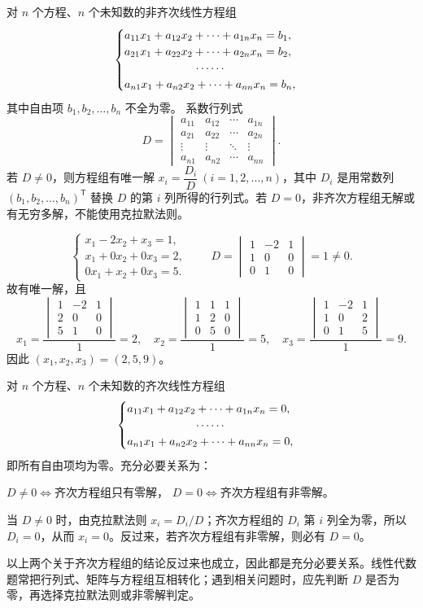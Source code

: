 \documentclass[UTF8,zihao=5,fontset=mac]{ctexart}
\newcommand{\dmat}[1]{\begin{vmatrix}#1\end{vmatrix}}
\begin{document}
\begin{summarybox}[一、非齐次线性方程组]
对 $n$ 个方程、$n$ 个未知数的非齐次线性方程组
\[
\begin{cases}
a_{11}x_1+a_{12}x_2+\cdots+a_{1n}x_n=b_1,\\
a_{21}x_1+a_{22}x_2+\cdots+a_{2n}x_n=b_2,\\
\hfill\cdots\cdots\hfill\\
a_{n1}x_1+a_{n2}x_2+\cdots+a_{nn}x_n=b_n,
\end{cases}
\]
其中自由项 $b_1,b_2,\ldots,b_n$ 不全为零。
系数行列式
\[
D=\dmat{a_{11}&a_{12}&\cdots&a_{1n}\\a_{21}&a_{22}&\cdots&a_{2n}\\\vdots&\vdots&\ddots&\vdots\\a_{n1}&a_{n2}&\cdots&a_{nn}}.
\]
若 $D\ne0$，则方程组有唯一解 $\boxed{x_i=\dfrac{D_i}{D}}\ (i=1,2,\ldots,n)$，其中 $D_i$ 是用常数列 $(b_1,b_2,\ldots,b_n)^{\mathsf T}$ 替换 $D$ 的第 $i$ 列所得的行列式。若 $D=0$，非齐次方程组无解或有无穷多解，不能使用克拉默法则。
\end{summarybox}

\begin{problembox}[示例]
\[
\begin{cases}
x_1-2x_2+x_3=1,\\
x_1+0x_2+0x_3=2,\\
0x_1+x_2+0x_3=5.
\end{cases}
\qquad
D=\dmat{1&-2&1\\1&0&0\\0&1&0}=1\ne0.
\]
故有唯一解，且
\[
x_1=\frac{\dmat{1&-2&1\\2&0&0\\5&1&0}}{1}=2,\quad
x_2=\frac{\dmat{1&1&1\\1&2&0\\0&5&0}}{1}=5,\quad
x_3=\frac{\dmat{1&-2&1\\1&0&2\\0&1&5}}{1}=9.
\]
因此 $(x_1,x_2,x_3)=(2,5,9)$。
\end{problembox}

\begin{summarybox}[二、齐次线性方程组]
对 $n$ 个方程、$n$ 个未知数的齐次线性方程组
\[
\begin{cases}
a_{11}x_1+a_{12}x_2+\cdots+a_{1n}x_n=0,\\
\hfill\cdots\cdots\hfill\\
a_{n1}x_1+a_{n2}x_2+\cdots+a_{nn}x_n=0,
\end{cases}
\]
即所有自由项均为零。充分必要关系为：
\par\noindent $\boxed{D\ne0\Longleftrightarrow\text{齐次方程组只有零解}}$，\qquad
$\boxed{D=0\Longleftrightarrow\text{齐次方程组有非零解}}$。
\par\noindent 当 $D\ne0$ 时，由克拉默法则 $x_i=D_i/D$；齐次方程组的 $D_i$ 第 $i$ 列全为零，所以 $D_i=0$，从而 $x_i=0$。反过来，若齐次方程组有非零解，则必有 $D=0$。
\end{summarybox}

\begin{summarybox}[注]
以上两个关于齐次方程组的结论反过来也成立，因此都是充分必要关系。线性代数题常把行列式、矩阵与方程组互相转化；遇到相关问题时，应先判断 $D$ 是否为零，再选择克拉默法则或非零解判定。
\end{summarybox}
\endgroup
\end{document}
